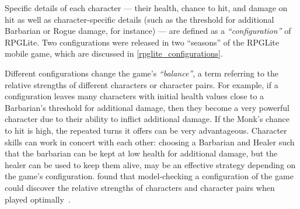 Specific details of each character --- their health, chance to hit, and damage
on hit as well as character-specific details (such as the threshold for
additional Barbarian or Rogue damage, for instance) --- are defined as a
\emph{``configuration''} of RPGLite. Two configurations were released in two
``seasons'' of the RPGLite mobile game, which are discussed in
\cref{rpglite_configurations}.

Different configurations change the game's \emph{``balance''}, a term referring
to the relative strengths of different characters or character pairs. For
example, if a configuration leaves many characters with initial health values
close to a Barbarian's threshold for additional damage, then they become a very
powerful character due to their ability to inflict additional damage. If the
Monk's chance to hit is high, the repeated turns it offers can be very
advantageous. Character skills can work in concert with each other: choosing a
Barbarian and Healer such that the barbarian can be kept at low health for
additional damage, but the healer can be used to keep them alive, may be an
effective strategy depending on the game's configuration.
\citeauthor{kavanagh2019balancing} found that model-checking a configuration of
the game could discover the relative strengths of characters and character pairs
when played optimally~\cite{kavanagh2019balancing}.


